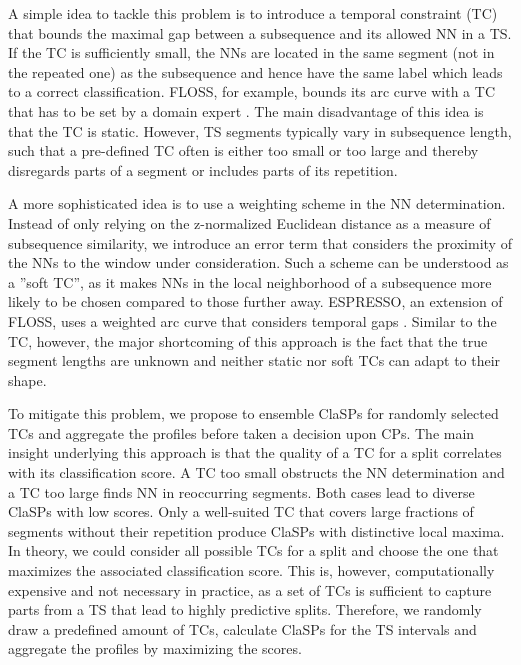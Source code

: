 \documentclass[pdflatex,sn-basic]{sn-jnl}
\begin{document}
A simple idea to tackle this problem is to introduce a temporal constraint (TC) that bounds the maximal gap between a subsequence and its allowed NN in a TS. If the TC is sufficiently small, the NNs are located in the same segment (not in the repeated one) as the subsequence and hence have the same label which leads to a correct classification. FLOSS, for example, bounds its arc curve with a TC that has to be set by a domain expert \citep{gharghabi2017matrix}. The main disadvantage of this idea is that the TC is static. However, TS segments typically vary in subsequence length, such that a pre-defined TC often is either too small or too large and thereby disregards parts of a segment or includes parts of its repetition.

A more sophisticated idea is to use a weighting scheme in the NN determination. Instead of only relying on the z-normalized Euclidean distance as a measure of subsequence similarity, we introduce an error term that considers the proximity of the NNs to the window under consideration. Such a scheme can be understood as a ''soft TC'', as it makes NNs in the local neighborhood of a subsequence more likely to be chosen compared to those further away. ESPRESSO, an extension of FLOSS, uses a weighted arc curve that considers temporal gaps \citep{Deldari2020ESPRESSOEA}. Similar to the TC, however, the major shortcoming of this approach is the fact that the true segment lengths are unknown and neither static nor soft TCs can adapt to their shape.  

To mitigate this problem, we propose to ensemble ClaSPs for randomly selected TCs and aggregate the profiles before taken a decision upon CPs. The main insight underlying this approach is that the quality of a TC for a split correlates with its classification score. A TC too small obstructs the NN determination and a TC too large finds NN in reoccurring segments. Both cases lead to diverse ClaSPs with low scores. Only a well-suited TC that covers large fractions of segments without their repetition produce ClaSPs with distinctive local maxima. In theory, we could consider all possible TCs for a split and choose the one that maximizes the associated classification score. This is, however, computationally expensive and not necessary in practice, as a set of TCs is sufficient to capture parts from a TS that lead to highly predictive splits. Therefore, we randomly draw a predefined amount of TCs, calculate ClaSPs for the TS intervals and aggregate the profiles by maximizing the scores.
\end{document}
